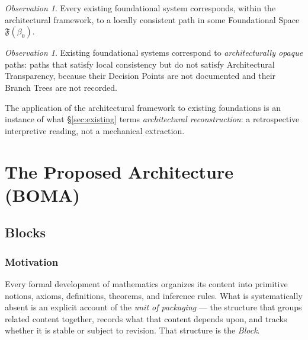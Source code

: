 \documentclass[12pt, a4paper]{article}
\theoremstyle{plain}
\theoremstyle{definition}
\theoremstyle{remark}
\newtheorem{observation}[theorem]{Observation}
\newcommand{\FS}[1]{\mathfrak{F}(#1)}
\newcommand{\BOMA}{\textsf{BOMA}}
\begin{document}
\begin{observation}
\label{obs:existing-paths}
Every existing foundational system corresponds, within the
architectural framework, to a locally consistent path in some
Foundational Space $\FS{\beta_0}$.
\end{observation}

\begin{observation}
\label{obs:existing-opaque}
Existing foundational systems correspond to
\emph{architecturally opaque} paths: paths that satisfy local
consistency but do not satisfy Architectural Transparency,
because their Decision Points are not documented and their Branch
Trees are not recorded.

The application of the architectural framework to existing
foundations is an instance of what \S\ref{sec:existing} terms
\emph{architectural reconstruction}: a retrospective
interpretive reading, not a mechanical extraction.
\end{observation}

\section{The Proposed Architecture (\BOMA{})}
\label{sec:architecture}

\subsection{Blocks}
\label{subsec:blocks}

\subsubsection*{Motivation}

Every formal development of mathematics organizes its content
into primitive notions, axioms, definitions, theorems, and
inference rules. What is systematically absent is an explicit
account of the \emph{unit of packaging} --- the structure that
groups related content together, records what that content
depends upon, and tracks whether it is stable or subject to
revision. That structure is the \emph{Block}.
\end{document}
